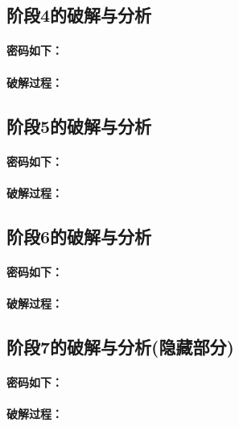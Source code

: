 \subsection{阶段4的破解与分析}

\paragraph{密码如下：}

\paragraph{破解过程：}

\subsection{阶段5的破解与分析}

\paragraph{密码如下：}

\paragraph{破解过程：}

\subsection{阶段6的破解与分析}

\paragraph{密码如下：}

\paragraph{破解过程：}

\subsection{阶段7的破解与分析(隐藏部分)}

\paragraph{密码如下：}

\paragraph{破解过程：}
